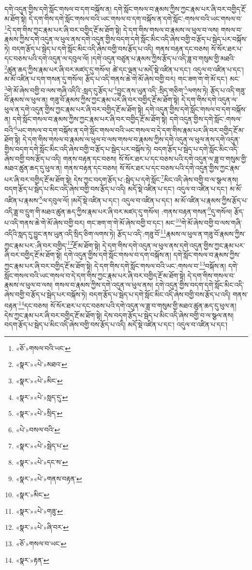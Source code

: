 དགེ་འདུན་གྱིས་དགེ་སློང་གསལ་བ་དག་བསྐོས་ན། དགེ་སློང་གསལ་བ་རྣམས་ཀྱིས་ཀྱང་རྣམ་པར་ཞི་བར་བགྱིད་རྔོ་མ་ཐོག་སྟེ། དེ་དག་གིས་དགེ་སློང་གསལ་བའི་ཡང་གསལ་བ་དག་བསྐོས་ན་དགེ་སློང་:གསལ་བའི་ཡང་གསལ་བ་\footnote{«ཅོ་»གསལ་བའི་ཡང་}དེ་དག་གིས་ཀྱང་རྣམ་པར་ཞི་བར་བགྱིད་རྔོ་མ་ཐོག་སྟེ། དེ་དག་གིས་གསལ་བ་རྣམས་ལ་ཕུལ་བ་ལས། གསལ་བ་རྣམས་ཀྱིས་དགེ་འདུན་ལ་ཕུལ་ནས་དགེ་འདུན་གྱིས་བདག་དགེ་སློང་མིང་འདི་ཞེས་བགྱི་བ་རྩོད་པ་སྦེད་པར་བསྐོས་ཏེ། བདག་རྩོད་པ་སྦེད་པ་དགེ་སློང་མིང་འདི་ཞེས་བགྱི་བས་རྩོད་པ་འདི། གནས་བརྟན་དང་བཅས། སོ་སོར་ཐར་པ་དང་བཅས་པའི་དགེ་འདུན་ལ་དབུལ་ལོ། །དགེ་འདུན་བཙུན་པ་རྣམས་ཀྱིས་རྩོད་པ་འདི་ཟླ་བ་གསུམ་གྱི་མཐའི་\footnote{«སྣར་»«པེ་»མཐའ་}ཚུན་ཆད་ཀྱིས་རྣམ་པར་ཞི་བར་མཛད་དུ་གསོལ། ཚེ་དང་ལྡན་པ་མདོ་སྡེ་འཛིན་པ་དང་། འདུལ་བ་འཛིན་པ་དང་། མ་མོ་འཛིན་པ་དག་གསན་དུ་གསོལ། རྩོད་པ་འདི་གནས་ཆེ་གེ་མོ་ཞེས་བགྱི་བར། གང་ཟག་ག་གེ་མོ་དང་། མང་\footnote{«སྣར་»«པེ་»མིང་}གེ་མོ་ཞེས་བགྱི་བ་ལས་གཞི་འདིའི་:སླད་དུ་རྩོད་པ་\footnote{«སྣར་»«པེ་»སླད་དུ་}བྱུང་ནས་ཡུན་འདི་:སྲིད་གཅིག་\footnote{«སྣར་»«པེ་»སྲིད་}ལགས་ཏེ། རྩོད་པ་འདི་གཟུ་བོ་རྣམས་ལ་ཕུལ་ན། གཟུ་བོ་རྣམས་ཀྱིས་ཀྱང་རྣམ་པར་ཞི་བར་བགྱིད་རྔོ་མ་ཐོག་སྟེ། དེ་དག་གིས་དགེ་འདུན་ལ་ཕུལ་ན་དགེ་འདུན་གྱིས་ཀྱང་རྣམ་པར་ཞི་བར་བགྱིད་རྔོ་མ་ཐོག་སྟེ། དགེ་འདུན་གྱིས་དགེ་སློང་གསལ་བ་དག་བསྐོས་ན། དགེ་སློང་གསལ་བ་རྣམས་ཀྱིས་ཀྱང་རྣམ་པར་ཞི་བར་བགྱིད་རྔོ་མ་ཐོག་སྟེ། དགེ་འདུན་གྱིས་དགེ་སློང་:གསལ་བའི་\footnote{«པེ་»བསལ་བའི་}ཡང་གསལ་བ་དག་བསྐོས་ན་དགེ་སློང་གསལ་བའི་ཡང་གསལ་བ་དེ་དག་གིས་རྣམ་པར་ཞི་བར་བགྱིད་རྔོ་མ་ཐོག་སྟེ། དེ་དག་གིས་གསལ་བ་རྣམས་ལ་ཕུལ་བ་ལས་གསལ་བ་རྣམས་ཀྱིས་དགེ་འདུན་ལ་ཕུལ་ནས་དགེ་འདུན་གྱིས་བདག་དགེ་སློང་མིང་འདི་ཞེས་བགྱི་བ་རྩོད་པ་སྦེད་པར་བསྐོས་ཏེ། བདག་རྩོད་པ་སྦེད་པ་དགེ་སློང་མིང་འདི་ཞེས་བགྱི་བས་རྩོད་པ་འདི། གནས་བརྟན་དང་བཅས། སོ་སོར་ཐར་པ་དང་བཅས་པའི་དགེ་འདུན་ལ་ཟླ་བ་གསུམ་གྱི་མཐའ་ཚུན་ཆད་དུ་ཕུལ་ན། གནས་བརྟན་དང་བཅས། སོ་སོར་ཐར་པ་དང་བཅས་པའི་དགེ་འདུན་གྱིས་ཀྱང་རྣམ་པར་ཞི་བར་བགྱིད་རྔོ་མ་ཐོག་སྟེ། དེས་ཀྱང་བདག་རྩོད་པ་:སྦེད་པ་དགེ་སློང་\footnote{«སྣར་»«པེ་»སྦེད་པ་}མིང་འདི་ཞེས་བགྱི་བ་ལ་སྩལ་ནས། བདག་རྩོད་པ་སྦེད་པ་མིང་འདི་ཞེས་བགྱི་བས་རྩོད་པ་འདི། མདོ་སྡེ་འཛིན་པ་དང་། འདུལ་བ་འཛིན་པ་དང་། མ་མོ་འཛིན་པ་རྣམས་\footnote{«སྣར་»«པེ་»དང་ས་}ལ་དབུལ་ལོ། །མདོ་སྡེ་འཛིན་པ་དང་། འདུལ་བ་འཛིན་པ་དང་། མ་མོ་འཛིན་པ་རྣམས་ཀྱིས་རྩོད་པ་འདི་ཟླ་བ་དྲུག་གི་མཐའ་ཚུན་ཆད་ཀྱིས་རྣམ་པར་ཞི་བར་མཛད་དུ་གསོལ། :གནས་བརྟན་གསན་\footnote{«སྣར་»«པེ་»གནས་བརྟན་}དུ་གསོལ། རྩོད་པ་འདི་གནས་ཆེ་གེ་མོ་ཞེས་བགྱི་བར། གང་ཟག་ག་གེ་མོ་ཞེས་བགྱི་བ་དང་། མང་\footnote{«སྣར་»མིང་}གེ་མོ་ཞེས་བགྱི་བ་ལས་གཞི་འདིའི་སླད་དུ་བྱུང་ནས་ཡུན་འདི་སྲིད་ཅིག་ལགས་ཏེ། རྩོད་པ་འདི་:གཟུ་བོ་\footnote{«སྣར་»«པེ་»གཟུ་}རྣམས་ལ་ཕུལ་ན་གཟུ་བོ་རྣམས་ཀྱིས་ཀྱང་རྣམ་པར་:ཞི་བར་བགྱིད་\footnote{«སྣར་»«པེ་»ཞི་བར་}རྔོ་མ་ཐོག་སྟེ། དེ་དག་གིས་དགེ་འདུན་ལ་ཕུལ་ནས་དགེ་འདུན་གྱིས་ཀྱང་རྣམ་པར་ཞི་བར་བགྱིད་རྔོ་མ་ཐོག་སྟེ། དགེ་འདུན་གྱིས་དགེ་སློང་གསལ་བ་དག་བསྐོས་ན། དགེ་སློང་གསལ་བ་རྣམས་ཀྱིས་ཀྱང་རྣམ་པར་ཞི་བར་བགྱིད་རྔོ་མ་ཐོག་སྟེ། དེ་དག་གིས་དགེ་སློང་གསལ་བའི་ཡང་:གསལ་བ་\footnote{«ཅོ་»གསལ་བ་ཡང་}བསྐོས་ན། དགེ་སློང་གསལ་བའི་ཡང་གསལ་བ་དེ་དག་གིས་ཀྱང་རྣམ་པར་ཞི་བར་བགྱིད་རྔོ་མ་ཐོག་སྟེ། དེ་དག་གིས་གསལ་བ་རྣམས་ལ་ཕུལ་བ་ལས། གསལ་བ་རྣམས་ཀྱིས་དགེ་འདུན་ལ་ཕུལ་ནས། དགེ་འདུན་གྱིས་བདག་དགེ་སློང་མིང་འདི་ཞེས་བགྱི་བ་རྩོད་པ་སྦེད་པར་བསྐོས་ཏེ། བདག་རྩོད་པ་སྦེད་པ་དགེ་སློང་མིང་འདི་ཞེས་བགྱི་བས་རྩོད་པ་འདི། གནས་བརྟན་\footnote{«སྣར་»རྟན་}དང་བཅས། སོ་སོར་ཐར་པ་དང་བཅས་པའི་དགེ་འདུན་ལ་ཟླ་བ་གསུམ་གྱི་མཐའ་ཚུན་ཆད་དུ་ཕུལ་ན། དེས་ཀྱང་རྣམ་པར་ཞི་བར་བགྱིད་རྔོ་མ་ཐོག་སྟེ། དེས་བདག་རྩོད་པ་སྦེད་པ་མིང་འདི་ཞེས་བགྱི་བ་ལ་སྩལ་ནས། བདག་རྩོད་པ་སྦེད་པ་མིང་འདི་ཞེས་བགྱི་བས་རྩོད་པ་འདི། མདོ་སྡེ་འཛིན་པ་དང་། འདུལ་བ་འཛིན་པ་དང་། 